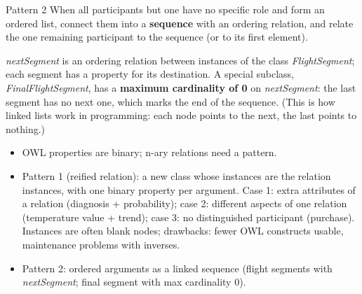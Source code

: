 \begin{nbfact}{Pattern 2}
When all participants but one have no specific role and form an ordered list, connect
them into a \textbf{sequence} with an ordering relation, and relate the one remaining
participant to the sequence (or to its first element).
\end{nbfact}

\begin{center}
\end{center}

\emph{nextSegment} is an ordering relation between instances of the class
\emph{FlightSegment}; each segment has a property for its destination. A special
subclass, \emph{FinalFlightSegment}, has a \textbf{maximum cardinality of 0} on
\emph{nextSegment}: the last segment has no next one, which marks the end of the
sequence. (This is how linked lists work in programming: each node points to the next,
the last points to nothing.)

\begin{nbsummary}
\begin{itemize}[nosep]
  \item OWL properties are binary; n-ary relations need a pattern.
  \item Pattern 1 (reified relation): a new class whose instances are the relation
        instances, with one binary property per argument. Case 1: extra attributes of a
        relation (diagnosis + probability); case 2: different aspects of one relation
        (temperature value + trend); case 3: no distinguished participant (purchase).
        Instances are often blank nodes; drawbacks: fewer OWL constructs usable,
        maintenance problems with inverses.
  \item Pattern 2: ordered arguments as a linked sequence (flight segments with
        \emph{nextSegment}; final segment with max cardinality 0).
\end{itemize}
\end{nbsummary}
